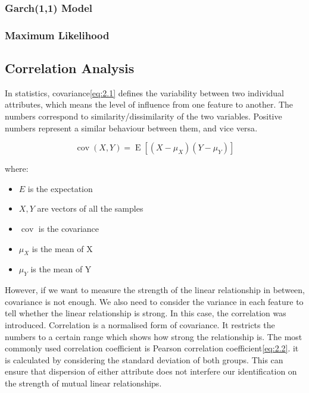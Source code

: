 \documentclass[11pt]{article} %
\theoremstyle{plain}
\theoremstyle{definition}
\begin{document}
\subsubsection{Garch(1,1) Model}
\subsubsection{Maximum Likelihood}

\subsection{Correlation Analysis}

In statistics, covariance\eqref{eq:2.1} defines the variability between two individual attributes, which means the level of influence from one feature to another. The numbers correspond to similarity/dissimilarity of the two variables. Positive numbers represent a similar behaviour between them, and vice versa\cite{wiki/cov:2018}.

{
  \begin{equation}
    \label{eq:2.1}
    \tag{2.1}
    {\operatorname {cov} (X,Y)=\operatorname {E} [(X-\mu _{X})(Y-\mu _{Y})]}
  \end{equation}

  \footnotesize
  where:
  \begin{itemize}[label=-, leftmargin=4em, itemsep=0.1em]
    \item ${E}$ is the expectation
    \item ${X, Y}$ are vectors of all the samples
    \item $\operatorname {cov}$ is the covariance
    \item ${\mu}_{X}$ is the mean of X
    \item ${\mu}_{Y}$ is the mean of Y
  \end{itemize}
}

However, if we want to measure the strength of the linear relationship in between, covariance is not enough. We also need to consider the variance in each feature to tell whether the linear relationship is strong. In this case, the correlation was introduced. Correlation is a normalised form of covariance. It restricts the numbers to a certain range which shows how strong the relationship is. The most commonly used correlation coefficient is Pearson correlation coefficient\eqref{eq:2.2}. it is calculated by considering the standard deviation of both groups. This can ensure that dispersion of either attribute does not interfere our identification on the strength of mutual linear relationships\cite{ghall/pcc:2015}.
\end{document}
